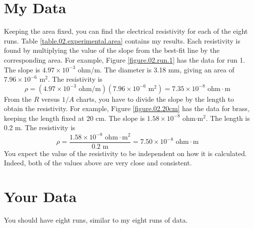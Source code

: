 \section{My Data}
%
Keeping the area fixed, you can find the electrical resistivity for each of the eight runs. Table \ref{table.02.experimental.area} contains my results. Each resistivity is found by multiplying the value of the slope from the best-fit line by the corresponding area. For example, Figure \ref{figure.02.run.1} has the data for run 1. The slope is $4.97 \times 10^{-3}$ ohm/m. The diameter is 3.18 mm, giving an area of $7.96 \times 10^{-6}$ m$^{2}$. The resistivity is
\begin{equation}
	\rho = \left(4.97 \times 10^{-3} \text{ ohm/m}\right) \left(7.96 \times 10^{-6} \text{ m}^{2}\right) = 7.35 \times 10^{-8} \text{ ohm}\cdot\text{m}
\end{equation}
From the $R$ versus $1/A$ charts, you have to divide the slope by the length to obtain the resistivity. For example, Figure \ref{figure.02.20cm} has the data for brass, keeping the length fixed at 20 cm. The slope is $1.58 \times 10^{-8}$ ohm$\cdot$m$^{2}$. The length is 0.2 m. The resistivity is
\begin{equation}
	\rho = \frac{1.58 \times 10^{-8} \text{ ohm}\cdot\text{m}^{2}}{0.2 \text{ m}} = 7.50 \times 10^{-8} \text{ ohm}\cdot\text{m}
\end{equation}
You expect the value of the resistivity to be independent on how it is calculated. Indeed, both of the values above are very close and consistent.
%
\section{Your Data}
%
You should have eight runs, similar to my eight runs of data.
%
\newpage
